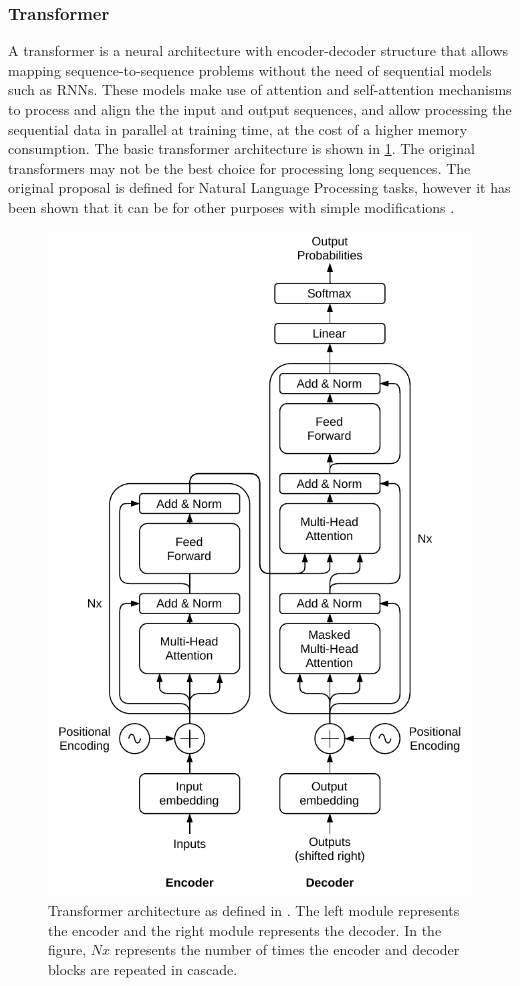 \subsubsection{Transformer}
A transformer \cite{vaswani2017} is a neural architecture with encoder-decoder structure that allows mapping sequence-to-sequence \cite{Sutskever2014} problems without the need of sequential models such as RNNs. These models make use of attention and self-attention mechanisms \cite{bahdanau2014} to process and align the the input and output sequences, and allow processing the sequential data in parallel at training time, at the cost of a higher memory consumption. The basic transformer  architecture is shown in \ref{fig:transformer}. The original transformers may not be the best choice for processing long sequences. The original proposal is defined for Natural Language Processing tasks, however it has been shown that it can be for other purposes with simple modifications \cite{naihan2019, jiarui2021, sanyuan2021}.

\begin{figure}
	\centering
	\includegraphics[width=0.8\linewidth]{chapter2/images/transformer}
	\caption{Transformer architecture as defined in \cite{vaswani2017}. The left module represents the encoder and the right module represents the decoder. In the figure, $Nx$ represents the number of times the encoder and decoder blocks are repeated in cascade.}
	\label{fig:transformer}
\end{figure}

